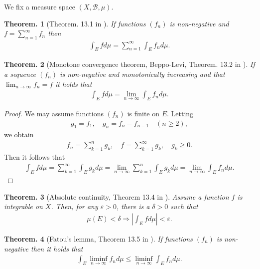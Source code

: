 \documentclass[openany, a4paper, oneside]{jsbook}
\theoremstyle{break}
\theoremstyle{breakdefn}
\newtheorem{thm}{Theorem.}[section]
\newcommand{\abs}[1]{\left|#1\right|}
\newcommand{\rbk}[1]{\left (#1\right)}
\newcommand{\calB}{\mathcal{B}}
\newcommand{\dmu}{d \mu}
\begin{document}
We fix a measure space $(X, \calB, \mu)$.
\begin{thm}[Theorem. 13.1 in \cite{SeizoIto1}]
 If functions $(f_n)$ is non-negative and $f = \sum_{n=1}^{\infty} f_n$ then
 \begin{align}
  \int_E f \dmu
  =
  \sum_{n=1}^{\infty} \int_E f_n \dmu.
 \end{align}
\end{thm}
\begin{thm}[Monotone convergence theorem, Beppo-Levi, Theorem. 13.2 in \cite{SeizoIto1}]
 If a sequence $(f_n)$ is non-negative and monotonically increasing and that $\lim_{n \to \infty} f_n = f$ it holds that
 \begin{align}
  \int_E f \dmu
  =
  \lim_{n \to \infty} \int_E f_n \dmu.
 \end{align}
\end{thm}
\begin{proof}
We may assume functions $(f_n)$ is finite on $E$.
Letting
\begin{align}
 g_1 = f_1, \quad
 g_n = f_n - f_{n-1} \quad (n \geq 2),
\end{align}
we obtain
\begin{align}
 f_n
 =
 \sum_{k=1}^n g_k, \quad
 f
 =
 \sum_{k=1}^{\infty} g_k, \quad
 g_k \geq 0.
\end{align}
Then it follows that
\begin{align}
 \int_E f \dmu
 =
 \sum_{k=1}^{\infty} \int_E g_k \dmu
 =
 \lim_{n \to \infty} \sum_{k=1}^n \int_E g_k \dmu
 =
 \lim_{n \to \infty} \int_E f_n \dmu.
\end{align}
\end{proof}
\begin{thm}[Absolute continuity, Theorem 13.4 in \cite{SeizoIto1}]
 Assume a function $f$ is integrable on $X$.
 Then, for any $\varepsilon > 0$, there is a $\delta > 0$ such that
 \begin{align}
  \mu \rbk{E} < \delta
  \Longrightarrow
  \abs{\int_E f \dmu} < \varepsilon.
 \end{align}
\end{thm}
\begin{thm}[Fatou's lemma, Theorem 13.5 in \cite{SeizoIto1}]
 If functions $(f_n)$ is non-negative then it holds that
 \begin{align}
  \int_E \liminf_{n \to \infty} f_n \dmu
  \leq
  \liminf_{n \to \infty} \int_E f_n \dmu.
 \end{align}
\end{thm}
\end{document}
